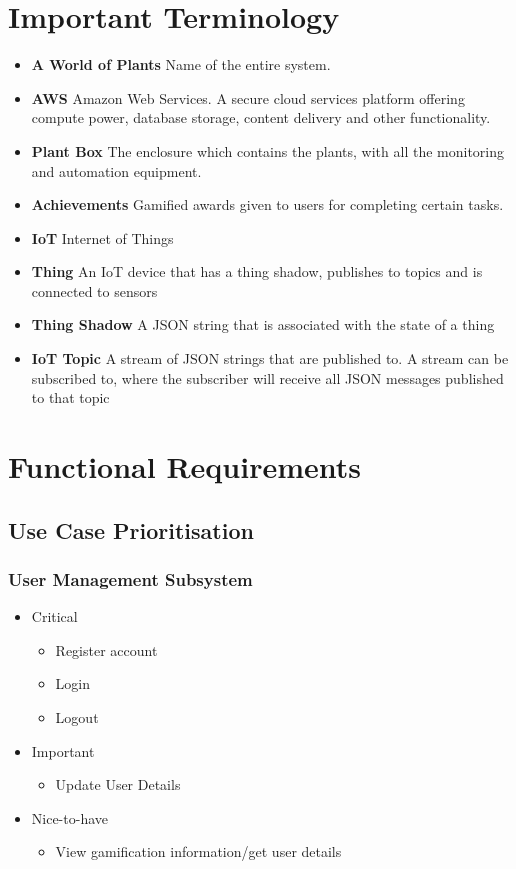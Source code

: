 \documentclass{article}
\begin{document}
\section{Important Terminology}
\begin{itemize}
	\item \textbf{A World of Plants} Name of the entire system.
	\item \textbf{AWS} Amazon Web Services. A secure cloud services platform offering compute power, database storage, content delivery and other functionality.
	\item \textbf{Plant Box} The enclosure which contains the plants, with all the monitoring and automation equipment.
	\item \textbf{Achievements} Gamified awards given to users for completing certain tasks.
	\item \textbf{IoT} Internet of Things
	\item \textbf{Thing} An IoT device that has a thing shadow, publishes to topics and is connected to sensors
	\item \textbf{Thing Shadow} A JSON string that is associated with the state of a thing
	\item \textbf{IoT Topic} A stream of JSON strings that are published to. A stream can be subscribed to, where the subscriber will receive all JSON messages published to that topic
\end{itemize}

\newpage

\section{Functional Requirements}
	\subsection{Use Case Prioritisation}
		\subsubsection{User Management Subsystem}
			\begin{itemize}
				\item Critical
				\begin{itemize}
					\item Register account
					\item Login
					\item Logout
				\end{itemize}
				
				\item Important
				\begin{itemize}
					\item Update User Details
				\end{itemize}
				
				\item Nice-to-have
				\begin{itemize}
					\item View gamification information/get user details
				\end{itemize}
			\end{itemize}
			
\end{document}
